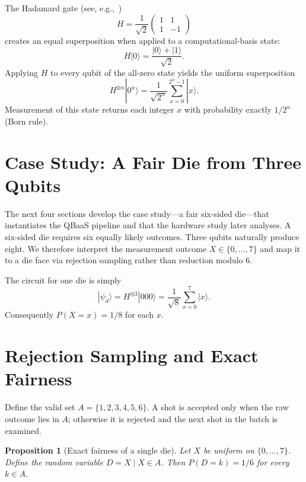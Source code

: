 \documentclass[journal]{IEEEtran}
\newtheorem{proposition}{Proposition}
\begin{document}
The Hadamard gate (see, e.g.,~\cite{nielsen2010quantum})
\begin{equation}
H = \frac{1}{\sqrt{2}}\begin{pmatrix}1 & 1\\1 & -1\end{pmatrix}
\end{equation}
creates an equal superposition when applied to a computational-basis state:
\begin{equation}
H|0\rangle = \frac{|0\rangle+|1\rangle}{\sqrt{2}}.
\end{equation}
Applying $H$ to every qubit of the all-zero state yields the uniform superposition
\begin{equation}
H^{\otimes n}|0^n\rangle = \frac{1}{\sqrt{2^n}}\sum_{x=0}^{2^n-1}|x\rangle.
\end{equation}
Measurement of this state returns each integer $x$ with probability exactly $1/2^n$ (Born rule).

\section{Case Study: A Fair Die from Three Qubits}
\label{sec:single}

The next four sections develop the case study---a fair six-sided die---that instantiates the QBaaS pipeline and that the hardware study later analyses. A six-sided die requires six equally likely outcomes. Three qubits naturally produce eight. We therefore interpret the measurement outcome $X\in\{0,\dots,7\}$ and map it to a die face via rejection sampling rather than reduction modulo 6.

The circuit for one die is simply
\begin{equation}
|\psi_d\rangle = H^{\otimes 3}|000\rangle = \frac{1}{\sqrt{8}}\sum_{x=0}^{7}|x\rangle.
\end{equation}
Consequently $P(X=x)=1/8$ for each $x$.

\section{Rejection Sampling and Exact Fairness}
\label{sec:rejection}

Define the valid set $A=\{1,2,3,4,5,6\}$. A shot is accepted only when the raw outcome lies in $A$; otherwise it is rejected and the next shot in the batch is examined.

\begin{proposition}[Exact fairness of a single die]\label{prop:single}
Let $X$ be uniform on $\{0,\dots,7\}$. Define the random variable $D=X\mid X\in A$. Then $P(D=k)=1/6$ for every $k\in A$.
\end{proposition}
\end{document}
